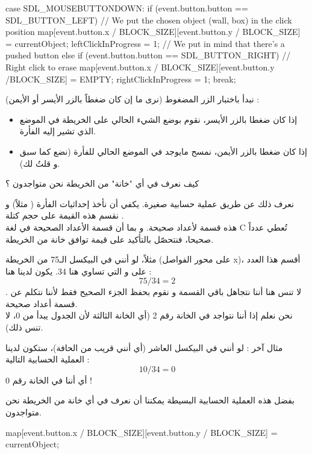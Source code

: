 \begin{Csource}
case SDL_MOUSEBUTTONDOWN:
if (event.button.button == SDL_BUTTON_LEFT)
{
	// We put the chosen object (wall, box) in the click position
	map[event.button.x / BLOCK_SIZE][event.button.y / BLOCK_SIZE] = currentObject;
	leftClickInProgress = 1; // We put in mind that there's a pushed button
}
else if (event.button.button == SDL_BUTTON_RIGHT) // Right click to erase
{
	map[event.button.x / BLOCK_SIZE][event.button.y /BLOCK_SIZE] = EMPTY;
	rightClickInProgress = 1;
}
break;
\end{Csource}

نبدأ باختبار الزر المضغوط (نرى ما إن كان ضغطاً بالزر الأيسر أو الأيمن) :

\begin{itemize}
	\item إذا كان ضغطا بالزر الأيسر، نقوم بوضع الشيء الحالي
	على الخريطة في الموضع الذي تشير إليه الفأرة.
	\item إذا كان ضغطا بالزر الأيمن، نمسح مايوجد في الموضع الحالي للفأرة (نضع 
	كما سبق و قلتُ لك).
\end{itemize}

\begin{question}
كيف نعرف في أي "خانة" من الخريطة نحن متواجدون ؟
\end{question}

نعرف ذلك عن طريق عملية حسابية صغيرة. يكفي أن نأخذ إحداثيات الفأرة
(
مثلاً) و نقسم هذه القيمة على حجم كتلة
.\\
هذه قسمة لأعداد صحيحة. و بما أن قسمة الأعداد الصحيحة في لغة 
\textenglish{C}
تُعطي عدداً صحيحا، فنتحصّل بالتأكيد على قيمة توافق خانة من الخريطة.

مثلاً، لو أنني في البيكسل الـ75 من الخريطة (على محور الفواصل
\textenglish{x})،
أقسم هذا العدد على 
و التي تساوي هنا 34. 
يكون لدينا هنا :
$$ 75/34=2 $$.
 لا تنس هنا أننا نتجاهل باقي القسمة و نقوم بحفظ الجزء الصحيح فقط لأننا نتكلم عن قسمة أعداد صحيحة.\\
نحن نعلم إذا أننا نتواجد في الخانة رقم 2 (أي الخانة الثالثة لأن الجدول يبدأ من 0، لا تنس ذلك).

مثال آخر : لو أنني في البيكسل العاشر (أي أنني قريب من الحافة)، ستكون لدينا العملية الحسابية التالية :
$$ 10/34=0 $$
أي أننا في الخانة رقم 0  !

بفضل هذه العملية الحسابية البسيطة يمكننا أن نعرف في أي خانة من الخريطة نحن متواجدون.

\begin{Csource}
map[event.button.x / BLOCK_SIZE][event.button.y / BLOCK_SIZE] = currentObject;
\end{Csource}


